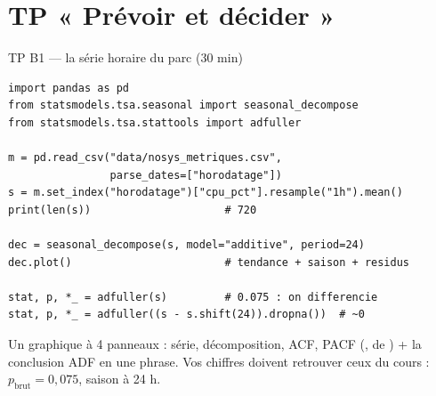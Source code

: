 \section{TP « Prévoir et décider »}

\begin{frame}[fragile]{TP B1 --- la série horaire du parc (30 min)}
\begin{codebox}
\begin{lstlisting}
import pandas as pd
from statsmodels.tsa.seasonal import seasonal_decompose
from statsmodels.tsa.stattools import adfuller

m = pd.read_csv("data/nosys_metriques.csv",
                parse_dates=["horodatage"])
s = m.set_index("horodatage")["cpu_pct"].resample("1h").mean()
print(len(s))                     # 720

dec = seasonal_decompose(s, model="additive", period=24)
dec.plot()                        # tendance + saison + residus

stat, p, *_ = adfuller(s)         # 0.075 : on differencie
stat, p, *_ = adfuller((s - s.shift(24)).dropna())  # ~0
\end{lstlisting}
\end{codebox}
\begin{abox}[Livrable B1]
Un graphique à 4 panneaux : série, décomposition, ACF, PACF
(,  de ) + la conclusion
ADF en une phrase. Vos chiffres doivent retrouver ceux du cours :
$p_{\text{brut}} = 0{,}075$, saison à 24 h.
\end{abox}
\end{frame}

